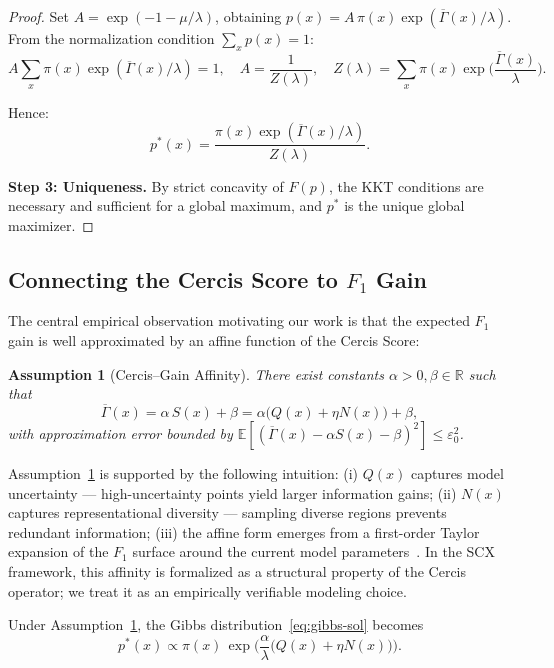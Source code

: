 \documentclass[12pt,a4paper]{article}
\newtheorem{assumption}[theorem]{Assumption}
\newcommand{\R}{\mathbb{R}}
\newcommand{\E}{\mathbb{E}}
\begin{document}
\begin{proof}
Set $A = \exp(-1-\mu/\lambda)$, obtaining $p(x) = A\,\pi(x)\exp(\overline{\Gamma}(x)/\lambda)$.
From the normalization condition $\sum_x p(x)=1$:
\[
A\sum_x \pi(x)\exp(\overline{\Gamma}(x)/\lambda) = 1,\quad
A = \frac{1}{Z(\lambda)},\quad
Z(\lambda)=\sum_x \pi(x)\exp\!\Big(\frac{\overline{\Gamma}(x)}{\lambda}\Big).
\]

Hence:
\[
p^*(x) = \frac{\pi(x)\exp(\overline{\Gamma}(x)/\lambda)}{Z(\lambda)}.
\]

\textbf{Step 3: Uniqueness.}
By strict concavity of $F(p)$, the KKT conditions are necessary and sufficient for a global maximum, and $p^*$ is the unique global maximizer.
\end{proof}

\subsection{Connecting the Cercis Score to $F_1$ Gain}

The central empirical observation motivating our work is that the expected
$F_1$ gain is well approximated by an affine function of the Cercis Score:

\begin{assumption}[Cercis--Gain Affinity]
\label{ass:affinity}
There exist constants $\alpha>0,\beta\in\R$ such that
\begin{equation}\label{eq:affinity}
    \overline{\Gamma}(x) = \alpha\,S(x) + \beta
    = \alpha\big(Q(x)+\eta N(x)\big) + \beta,
\end{equation}
with approximation error bounded by
$\E[(\overline{\Gamma}(x)-\alpha S(x)-\beta)^2]\leq\varepsilon_0^2$.
\end{assumption}

Assumption~\ref{ass:affinity} is supported by the following intuition: (i)
$Q(x)$ captures model uncertainty — high-uncertainty points yield larger
information gains; (ii) $N(x)$ captures representational diversity —
sampling diverse regions prevents redundant information; (iii) the affine
form emerges from a first-order Taylor expansion of the $F_1$ surface around
the current model parameters~\citep{ash2020warm}.  In the \textsf{SCX} framework, this
affinity is formalized as a structural property of the Cercis operator; we
treat it as an empirically verifiable modeling choice.

\medskip\noindent
Under Assumption~\ref{ass:affinity}, the Gibbs distribution~\eqref{eq:gibbs-sol}
becomes
\begin{equation}\label{eq:p-star}
    p^*(x) \propto \pi(x)\,
    \exp\!\Big(\frac{\alpha}{\lambda}\big(Q(x)+\eta N(x)\big)\Big).
\end{equation}
\end{document}
